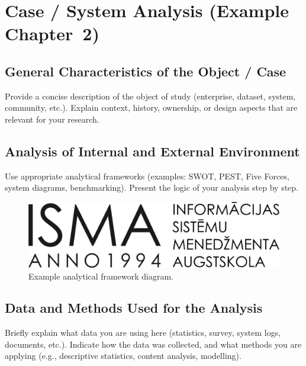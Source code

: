 \chapter{Case / System Analysis (Example Chapter~2)}
\label{chap:analysis}


\section{General Characteristics of the Object / Case}
Provide a concise description of the object of study (enterprise, dataset, system, community, etc.). Explain context, history, ownership, or design aspects that are relevant for your research.

\section{Analysis of Internal and External Environment}
Use appropriate analytical frameworks (examples: SWOT, PEST, Five Forces, system diagrams, benchmarking). Present the logic of your analysis step by step.

\begin{figure}[h]
  \centering
  \includegraphics[width=0.65\linewidth]{b_chapters/chapter1/assets/isma_logo.png}
  \caption{Example analytical framework diagram.}
  \label{fig:analysis-framework}
\end{figure}

\section{Data and Methods Used for the Analysis}
Briefly explain what data you are using here (statistics, survey, system logs, documents, etc.). Indicate how the data was collected, and what methods you are applying (e.g., descriptive statistics, content analysis, modelling).

